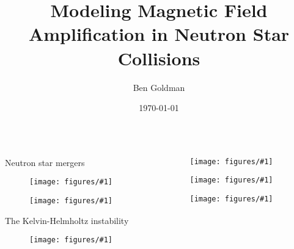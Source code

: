 \documentclass{beamer}
\title{Modeling Magnetic Field Amplification in Neutron Star Collisions}
\author{Ben Goldman}
\date{\today}
\newcommand{\myfig}[4]{
  \begin{figure}
    \centering
    \texttt{[image: figures/\#1]}
    \caption{#2}
    \label{fig:#4}
  \end{figure}
}
\begin{document}
\begin{frame}
  \maketitle
\begin{columns}
  \begin{column}{0.4\textwidth}
    \begin{block}{Neutron star mergers}
      \myfig{timeline.png}{}{0.8}{timeline}
      \myfig{merger.png}{}{0.8}{merger}
    \end{block}
    \begin{block}{The Kelvin-Helmholtz instability}
      \myfig{clouds.png}{}{0.8}{clouds}
    \end{block}
  \end{column}
  \begin{column}{0.6\textwidth}
    \myfig{cubes.pdf}{}{0.8}{cubes}
    \myfig{images.pdf}{}{0.8}{images}
    \myfig{lines.pdf}{}{0.8}{lines}
  \end{column}
\end{columns}
\end{frame}
\end{document}
